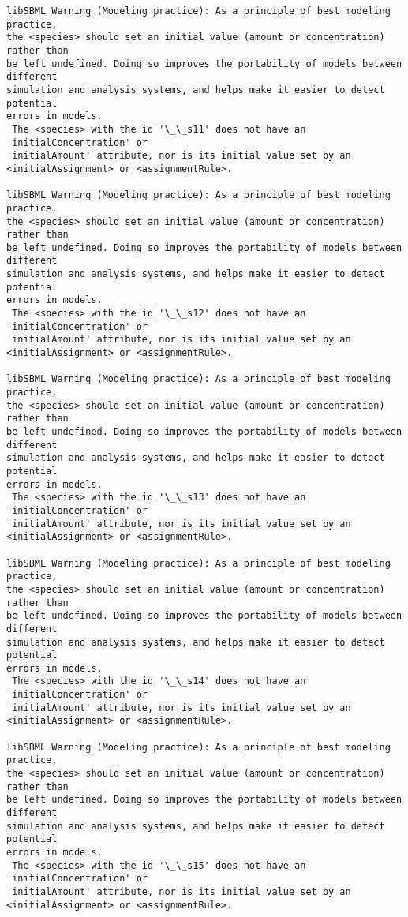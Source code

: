 \documentclass[11pt]{article}
\begin{document}
\begin{Verbatim}[commandchars=\\\{\}]
libSBML Warning (Modeling practice): As a principle of best modeling practice,
the <species> should set an initial value (amount or concentration) rather than
be left undefined. Doing so improves the portability of models between different
simulation and analysis systems, and helps make it easier to detect potential
errors in models.
 The <species> with the id '\_\_s11' does not have an 'initialConcentration' or
'initialAmount' attribute, nor is its initial value set by an
<initialAssignment> or <assignmentRule>.

libSBML Warning (Modeling practice): As a principle of best modeling practice,
the <species> should set an initial value (amount or concentration) rather than
be left undefined. Doing so improves the portability of models between different
simulation and analysis systems, and helps make it easier to detect potential
errors in models.
 The <species> with the id '\_\_s12' does not have an 'initialConcentration' or
'initialAmount' attribute, nor is its initial value set by an
<initialAssignment> or <assignmentRule>.

libSBML Warning (Modeling practice): As a principle of best modeling practice,
the <species> should set an initial value (amount or concentration) rather than
be left undefined. Doing so improves the portability of models between different
simulation and analysis systems, and helps make it easier to detect potential
errors in models.
 The <species> with the id '\_\_s13' does not have an 'initialConcentration' or
'initialAmount' attribute, nor is its initial value set by an
<initialAssignment> or <assignmentRule>.

libSBML Warning (Modeling practice): As a principle of best modeling practice,
the <species> should set an initial value (amount or concentration) rather than
be left undefined. Doing so improves the portability of models between different
simulation and analysis systems, and helps make it easier to detect potential
errors in models.
 The <species> with the id '\_\_s14' does not have an 'initialConcentration' or
'initialAmount' attribute, nor is its initial value set by an
<initialAssignment> or <assignmentRule>.

libSBML Warning (Modeling practice): As a principle of best modeling practice,
the <species> should set an initial value (amount or concentration) rather than
be left undefined. Doing so improves the portability of models between different
simulation and analysis systems, and helps make it easier to detect potential
errors in models.
 The <species> with the id '\_\_s15' does not have an 'initialConcentration' or
'initialAmount' attribute, nor is its initial value set by an
<initialAssignment> or <assignmentRule>.


\end{Verbatim}
\end{document}
